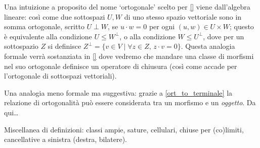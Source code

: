 \begin{remark}\label{perche_ortogonale}

  Una intuizione a proposito del nome `ortogonale' scelto per \ref{} viene dall'algebra lineare: così come due sottospazi $U,W$ di uno stesso spazio vettoriale sono in somma ortogonale, scritto $U\perp W$, se $u\cdot w=0$ per ogni $(u,w)\in U\times W$; questo è equivalente alla condizione $U\le W^\perp$, o alla condizione $W\le U^\perp$, dove per un sottospazio $Z$ si definisce $Z^\perp = \{v\in V\mid \forall z\in Z,\,z\cdot v=0\}$. Questa analogia formale verrà sostanziata in \ref{} dove vedremo che mandare una classe di morfismi nel suo ortogonale definisce un operatore di chiusura (così come accade per l'ortogonale di sottospazi vettoriali).

	Una analogia meno formale ma suggestiva: grazie a \ref{ort_to_terminale} la relazione di ortogonalità può essere considerata tra un morfismo e un \emph{oggetto}. Da qui\dots
%
%
\end{remark}
Miscellanea di definizioni: classi ampie, sature, cellulari, chiuse per (co)limiti, cancellative a sinistra (destra, bilatere).
